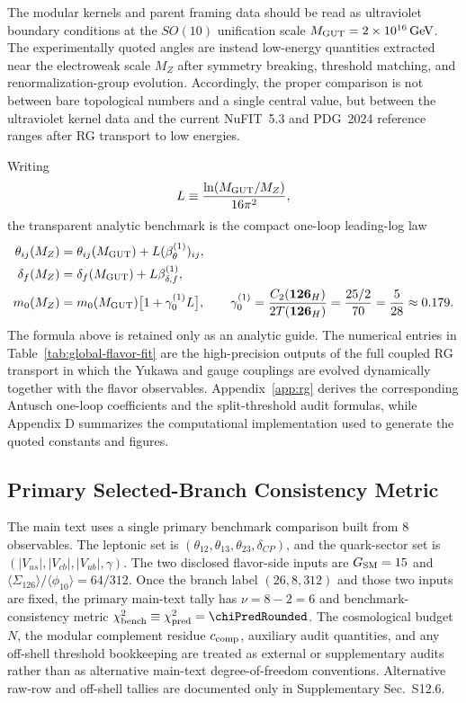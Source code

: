\documentclass[11pt]{article}
\begin{document}
The modular kernels and parent framing data should be read as ultraviolet boundary conditions at the $SO(10)$ unification scale $M_{\rm GUT}=2\times10^{16}\,\mathrm{GeV}$. The experimentally quoted angles are instead low-energy quantities extracted near the electroweak scale $M_Z$ after symmetry breaking, threshold matching, and renormalization-group evolution. Accordingly, the proper comparison is not between bare topological numbers and a single central value, but between the ultraviolet kernel data and the current NuFIT~5.3 and PDG~2024 reference ranges after RG transport to low energies.

Writing
\begin{equation}
 L\equiv\frac{\ln(M_{\rm GUT}/M_Z)}{16\pi^2},
\end{equation}
the transparent analytic benchmark is the compact one-loop leading-log law
\begin{align}
 \theta_{ij}(M_Z)
 &= \theta_{ij}(M_{\rm GUT})
 + L(\beta_{\theta}^{(1)})_{ij}, \\
 \delta_f(M_Z)
 &= \delta_f(M_{\rm GUT})
 + L\beta_{\delta,f}^{(1)}, \\
 m_0(M_Z)
 &= m_0(M_{\rm GUT})\bigl[1+\gamma_0^{(1)}L\bigr],
 \qquad
 \gamma_0^{(1)}=\frac{C_2(\mathbf{126}_H)}{2T(\mathbf{126}_H)}=\frac{25/2}{70}=\frac{5}{28}\approx0.179.
\end{align}
The formula above is retained only as an analytic guide. The numerical entries in Table~\ref{tab:global-flavor-fit} are the high-precision outputs of the full coupled RG transport in which the Yukawa and gauge couplings are evolved dynamically together with the flavor observables. Appendix~\ref{app:rg} derives the corresponding Antusch one-loop coefficients and the split-threshold audit formulas, while Appendix D summarizes the computational implementation used to generate the quoted constants and figures.

\subsection{Primary Selected-Branch Consistency Metric}

The main text uses a single primary benchmark comparison built from $8$ observables. The leptonic set is $(\theta_{12},\theta_{13},\theta_{23},\delta_{CP})$, and the quark-sector set is $(|V_{us}|,|V_{cb}|,|V_{ub}|,\gamma)$. The two disclosed flavor-side inputs are $G_{\rm SM}=15$ and $\langle \Sigma_{126}\rangle/\langle\phi_{10}\rangle=64/312$. Once the branch label $(26,8,312)$ and those two inputs are fixed, the primary main-text tally has $\nu=8-2=6$ and benchmark-consistency metric $\chi^2_{\rm bench}\equiv\chi^2_{\rm pred}=\chiPredRounded$. The cosmological budget $N$, the modular complement residue $c_{\rm comp}$, auxiliary audit quantities, and any off-shell threshold bookkeeping are treated as external or supplementary audits rather than as alternative main-text degree-of-freedom conventions. Alternative raw-row and off-shell tallies are documented only in Supplementary Sec.~S12.6. %
\end{document}
